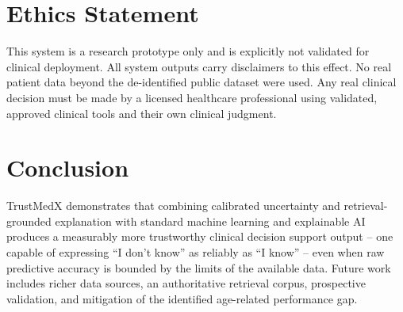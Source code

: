 \documentclass[12pt,onecolumn,journal]{IEEEtran}
\begin{document}
\section{Ethics Statement}
\label{sec:ethics}
This system is a research prototype only and is explicitly not validated for clinical deployment. All system outputs carry disclaimers to this effect. No real patient data beyond the de-identified public dataset were used. Any real clinical decision must be made by a licensed healthcare professional using validated, approved clinical tools and their own clinical judgment.

\section{Conclusion}
\label{sec:conclusion}
TrustMedX demonstrates that combining calibrated uncertainty and retrieval-grounded explanation with standard machine learning and explainable AI produces a measurably more trustworthy clinical decision support output -- one capable of expressing ``I don't know'' as reliably as ``I know'' -- even when raw predictive accuracy is bounded by the limits of the available data. Future work includes richer data sources, an authoritative retrieval corpus, prospective validation, and mitigation of the identified age-related performance gap.



\end{document}
